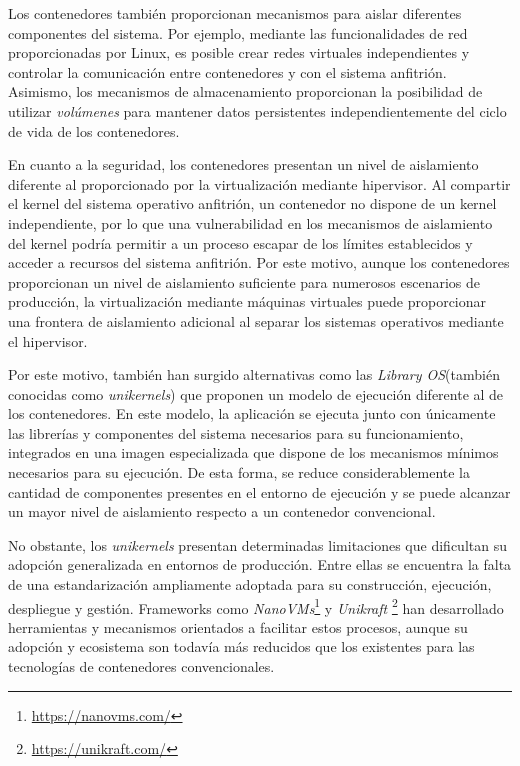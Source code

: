  Los contenedores también proporcionan mecanismos para aislar diferentes componentes del sistema. Por ejemplo, mediante las funcionalidades de red proporcionadas por Linux, es posible crear redes virtuales independientes y controlar la comunicación entre contenedores y con el sistema anfitrión. Asimismo, los mecanismos de almacenamiento proporcionan la posibilidad de utilizar \textit{volúmenes} para mantener datos persistentes independientemente del ciclo de vida de los contenedores.

 En cuanto a la seguridad, los contenedores presentan un nivel de aislamiento diferente al proporcionado por la virtualización mediante hipervisor. Al compartir el kernel del sistema operativo anfitrión, un contenedor no dispone de un kernel independiente, por lo que una vulnerabilidad en los mecanismos de aislamiento del kernel podría permitir a un proceso escapar de los límites establecidos y acceder a recursos del sistema anfitrión. Por este motivo, aunque los contenedores proporcionan un nivel de aislamiento suficiente para numerosos escenarios de producción, la virtualización mediante máquinas virtuales puede proporcionar una frontera de aislamiento adicional al separar los sistemas operativos mediante el hipervisor.

 Por este motivo, también han surgido alternativas como las \textit{Library OS}(también conocidas como \textit{unikernels}) que proponen un modelo de ejecución diferente al de los contenedores. En este modelo, la aplicación se ejecuta junto con únicamente las librerías y componentes del sistema necesarios para su funcionamiento, integrados en una imagen especializada que dispone de los mecanismos mínimos necesarios para su ejecución. De esta forma, se reduce considerablemente la cantidad de componentes presentes en el entorno de ejecución y se puede alcanzar un mayor nivel de aislamiento respecto a un contenedor convencional.

 No obstante, los \textit{unikernels} presentan determinadas limitaciones que dificultan su adopción generalizada en entornos de producción. Entre ellas se encuentra la falta de una estandarización ampliamente adoptada para su construcción, ejecución, despliegue y gestión. Frameworks como \textit{NanoVMs}\footnote{\url{https://nanovms.com/}} y \textit{Unikraft} \footnote{\url{https://unikraft.com/}} han desarrollado herramientas y mecanismos orientados a facilitar estos procesos, aunque su adopción y ecosistema son todavía más reducidos que los existentes para las tecnologías de contenedores convencionales.

